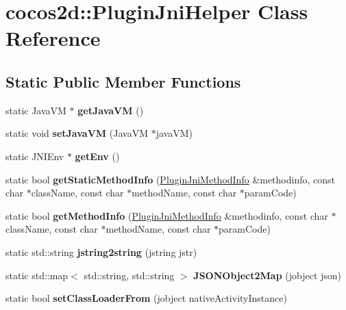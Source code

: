 \hypertarget{classcocos2d_1_1PluginJniHelper}{}\section{cocos2d\+:\+:Plugin\+Jni\+Helper Class Reference}
\label{classcocos2d_1_1PluginJniHelper}
\subsection*{Static Public Member Functions}
\begin{DoxyCompactItemize}
\item 
\mbox{\label{classcocos2d_1_1PluginJniHelper_a53922e5bcedaac4ac03cc74f2ca83d14}} 
static Java\+VM $\ast$ {\bfseries get\+Java\+VM} ()
\item 
\mbox{\label{classcocos2d_1_1PluginJniHelper_a67f10500e95d1a1f14cc21b7798d29f2}} 
static void {\bfseries set\+Java\+VM} (Java\+VM $\ast$java\+VM)
\item 
\mbox{\label{classcocos2d_1_1PluginJniHelper_a8318e9f7e5b490c2be34a41f3a24b1d0}} 
static J\+N\+I\+Env $\ast$ {\bfseries get\+Env} ()
\item 
\mbox{\label{classcocos2d_1_1PluginJniHelper_a560e6f6886234f63d87b0a1ff5af1257}} 
static bool {\bfseries get\+Static\+Method\+Info} (\hyperlink{structcocos2d_1_1PluginJniMethodInfo__}{Plugin\+Jni\+Method\+Info} \&methodinfo, const char $\ast$class\+Name, const char $\ast$method\+Name, const char $\ast$param\+Code)
\item 
\mbox{\label{classcocos2d_1_1PluginJniHelper_a9399b0163b1e07bbec3a1fe326f384e6}} 
static bool {\bfseries get\+Method\+Info} (\hyperlink{structcocos2d_1_1PluginJniMethodInfo__}{Plugin\+Jni\+Method\+Info} \&methodinfo, const char $\ast$class\+Name, const char $\ast$method\+Name, const char $\ast$param\+Code)
\item 
\mbox{\label{classcocos2d_1_1PluginJniHelper_a8e276c15c001955b3317a82f1fd0f508}} 
static std\+::string {\bfseries jstring2string} (jstring jstr)
\item 
\mbox{\label{classcocos2d_1_1PluginJniHelper_a58e47282c901f726acfcafbfbee106b9}} 
static std\+::map$<$ std\+::string, std\+::string $>$ {\bfseries J\+S\+O\+N\+Object2\+Map} (jobject json)
\item 
\mbox{\label{classcocos2d_1_1PluginJniHelper_ad8ecedb5f4d3017f364f366fb7c55e82}} 
static bool {\bfseries set\+Class\+Loader\+From} (jobject native\+Activity\+Instance)
\end{DoxyCompactItemize}
